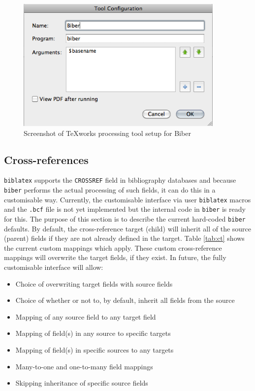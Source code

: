 \documentclass{ltxdockit}
\begin{document}
\begin{figure}[!htbp]
  \centering
  \includegraphics[width=4in,keepaspectratio=true]{biber-texworks.png}
  \caption{Screenshot of TeXworks processing tool setup for Biber}
  \label{fig:biber-texworks}
\end{figure}

\subsection{Cross-references}

\verb+biblatex+ supports the \verb+CROSSREF+ field in bibliography
databases and because \verb+biber+ performs the actual processing of such
fields, it can do this in a customisable way. Currently, the customisable
interface via user \verb+biblatex+ macros and the \verb+.bcf+ file is not
yet implemented but the internal code in \verb+biber+ is ready for this.
The purpose of this section is to describe the current hard-coded
\verb+biber+ defaults. By default, the cross-reference target (child) will
inherit all of the source (parent) fields if they are not already defined
in the target. Table \ref{tab:ct} shows the current custom
mappings which apply. These custom cross-reference mappings
will overwrite the target fields, if they exist. In future, the fully
customisable interface will allow:

\begin{itemize}
\item Choice of overwriting target fields with source fields
\item Choice of whether or not to, by default, inherit all fields from the source
\item Mapping of any source field to any target field
\item Mapping of field(s) in any source to specific targets
\item Mapping of field(s) in specific sources to any targets
\item Many-to-one and one-to-many field mappings
\item Skipping inheritance of specific source fields
\end{itemize}
\end{document}

